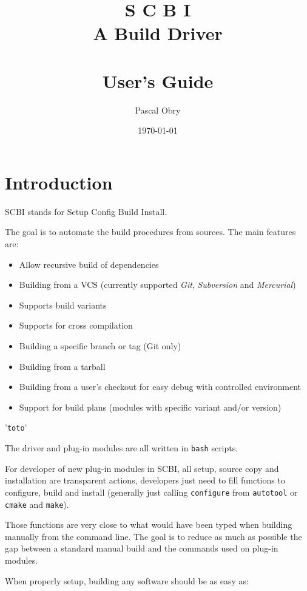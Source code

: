 \documentclass[a4paper,12pt,twoside]{article}
\title{{\Huge S C B I} \\
	{\large  A Build Driver \version} \\
	\hfill \\
	User's Guide}
\author{Pascal Obry}
\date{\today}
\newcommand{\code}[1]{\texttt{#1}}
\renewcommand{\emph}[1]{\textit{#1}}
\newcommand{\file}[1]{'{\texttt{#1}}'}
\let\stdsection\section
\renewcommand\section{\newpage\stdsection}
\begin{document}
\maketitle

%

\tableofcontents


\section{Introduction}

SCBI stands for Setup Config Build Install.

The goal is to automate the build procedures from sources. The main features are:

\begin{itemize}
	\item Allow recursive build of dependencies
	\item Building from a VCS (currently supported \emph{Git}, \emph{Subversion} and \emph{Mercurial})
	\item Supports build variants
	\item Supports for cross compilation
	\item Building a specific branch or tag (Git only)
	\item Building from a tarball
	\item Building from a user's checkout for easy debug with controlled environment
	\item Support for build plans (modules with specific variant and/or version)
\end{itemize}

\file{toto}

The driver and plug-in modules are all written in \code{bash} scripts.

For developer of new plug-in modules in SCBI, all setup, source copy and installation are transparent actions, developers just need to fill functions to configure, build and install (generally just calling \code{configure} from \code{autotool} or \code{cmake} and \code{make}).

Those functions are very close to what would have been typed when building manually from the command line. The goal is to reduce as much as possible the gap between a standard manual build and the commands used on plug-in modules.

When properly setup, building any software should be as easy as:
\end{document}
